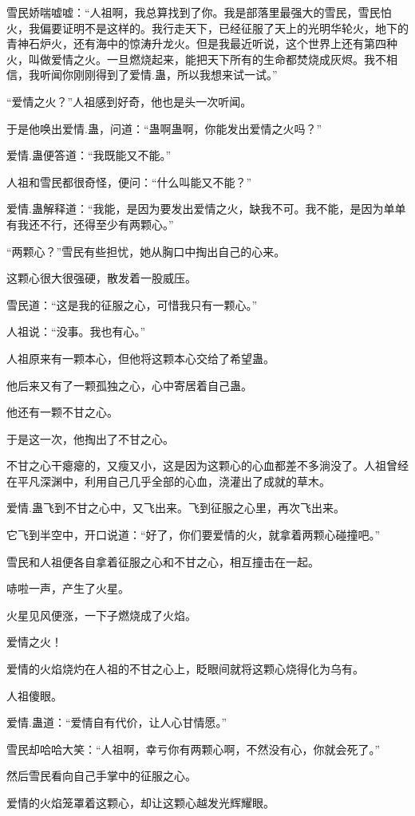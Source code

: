 \begin{this_body}
雪民娇喘嘘嘘：“人祖啊，我总算找到了你。我是部落里最强大的雪民，雪民怕火，我偏要证明不是这样的。我行走天下，已经征服了天上的光明华轮火，地下的青神石炉火，还有海中的惊涛升龙火。但是我最近听说，这个世界上还有第四种火，叫做爱情之火。一旦燃烧起来，能把天下所有的生命都焚烧成灰烬。我不相信，我听闻你刚刚得到了爱情.蛊，所以我想来试一试。”

“爱情之火？”人祖感到好奇，他也是头一次听闻。

于是他唤出爱情.蛊，问道：“蛊啊蛊啊，你能发出爱情之火吗？”

爱情.蛊便答道：“我既能又不能。”

人祖和雪民都很奇怪，便问：“什么叫能又不能？”

爱情.蛊解释道：“我能，是因为要发出爱情之火，缺我不可。我不能，是因为单单有我还不行，还得至少有两颗心。”

“两颗心？”雪民有些担忧，她从胸口中掏出自己的心来。

这颗心很大很强硬，散发着一股威压。

雪民道：“这是我的征服之心，可惜我只有一颗心。”

人祖说：“没事。我也有心。”

人祖原来有一颗本心，但他将这颗本心交给了希望蛊。

他后来又有了一颗孤独之心，心中寄居着自己蛊。

他还有一颗不甘之心。

于是这一次，他掏出了不甘之心。

不甘之心干瘪瘪的，又瘦又小，这是因为这颗心的心血都差不多淌没了。人祖曾经在平凡深渊中，利用自己几乎全部的心血，浇灌出了成就的草木。

爱情.蛊飞到不甘之心中，又飞出来。飞到征服之心里，再次飞出来。

它飞到半空中，开口说道：“好了，你们要爱情的火，就拿着两颗心碰撞吧。”

雪民和人祖便各自拿着征服之心和不甘之心，相互撞击在一起。

哧啦一声，产生了火星。

火星见风便涨，一下子燃烧成了火焰。

爱情之火！

爱情的火焰烧灼在人祖的不甘之心上，眨眼间就将这颗心烧得化为乌有。

人祖傻眼。

爱情.蛊道：“爱情自有代价，让人心甘情愿。”

雪民却哈哈大笑：“人祖啊，幸亏你有两颗心啊，不然没有心，你就会死了。”

然后雪民看向自己手掌中的征服之心。

爱情的火焰笼罩着这颗心，却让这颗心越发光辉耀眼。


\end{this_body}
